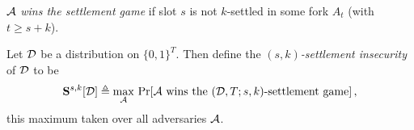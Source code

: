 \begin{center}
{\begin{minipage}{.9 \textwidth}
      $\mathcal{A}$ \emph{wins the settlement game} if slot $s$ is not
      $k$-settled in some fork $A_t$ (with $t \geq s+k$).
    \end{minipage}
  }
\end{center}

\begin{definition}
  Let $\mathcal{D}$ be a distribution on $\{0,1\}^T$. Then define
  the \emph{$(s,k)$-settlement insecurity} of $\mathcal{D}$ to be
  \[
    \mathbf{S}^{s,k}[\mathcal{D}] \triangleq \max_{\mathcal{A}}\, \Pr[\text{$\mathcal{A}$ wins the $(\mathcal{D}, T; s, k)$-settlement game}]
    \,,
  \]
  this maximum taken over all adversaries $\mathcal{A}$.
\end{definition}

